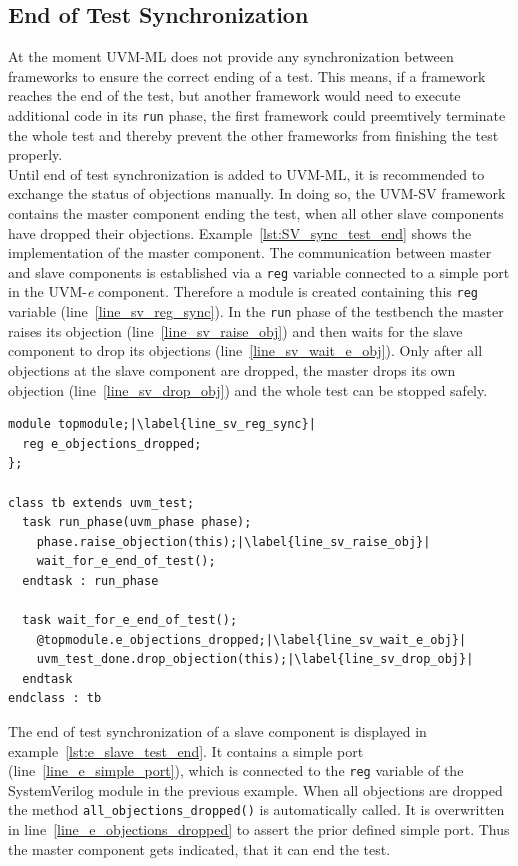 \subsection{End of Test Synchronization}
At the moment UVM-ML does not provide any synchronization between frameworks to ensure the correct ending of a test. This means, if a framework reaches the end of the test, but another framework would need to execute additional code in its \lstinline$run$ phase, the first framework could preemtively terminate the whole test and thereby prevent the other frameworks from finishing the test properly.\\
Until end of test synchronization is added to UVM-ML, it is recommended to exchange the status of objections manually. In doing so, the UVM-SV framework contains the master component ending the test, when all other slave components have dropped their objections. Example~\ref{lst:SV_sync_test_end} shows the implementation of the master component. The communication between master and slave components is established via a \lstinline$reg$ variable connected to a simple port in the UVM-\textit{e} component. Therefore a module is created containing this \lstinline$reg$ variable (line~\ref{line_sv_reg_sync}). In the \lstinline$run$ phase of the testbench the master raises its objection (line~\ref{line_sv_raise_obj}) and then waits for the slave component to drop its objections (line~\ref{line_sv_wait_e_obj}). Only after all objections at the slave component are dropped, the master drops its own objection (line~\ref{line_sv_drop_obj}) and the whole test can be stopped safely.
\lstset{language=SystemVerilog, numbers = left, escapechar=|, breaklines=true}
\begin{lstlisting}[frame=htrbl, caption={SystemVerilog: ending the test when UVM-\textit{e} components are ready},
label={lst:SV_sync_test_end}]
module topmodule;|\label{line_sv_reg_sync}|
  reg e_objections_dropped;
};

class tb extends uvm_test;
  task run_phase(uvm_phase phase);
    phase.raise_objection(this);|\label{line_sv_raise_obj}|
    wait_for_e_end_of_test();
  endtask : run_phase
  
  task wait_for_e_end_of_test();
    @topmodule.e_objections_dropped;|\label{line_sv_wait_e_obj}|
    uvm_test_done.drop_objection(this);|\label{line_sv_drop_obj}|
  endtask
endclass : tb
\end{lstlisting}
The end of test synchronization of a slave component is displayed in example~\ref{lst:e_slave_test_end}. It contains a simple port (line~\ref{line_e_simple_port}), which is connected to the \lstinline$reg$ variable of the SystemVerilog module in the previous example. When all objections are dropped the method \lstinline$all_objections_dropped()$ is automatically called. It is overwritten in line~\ref{line_e_objections_dropped} to assert the prior defined simple port. Thus the master component gets indicated, that it can end the test.
